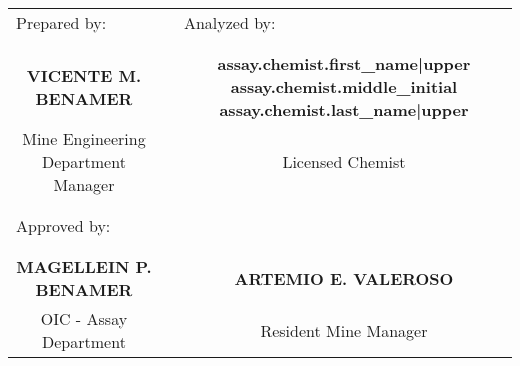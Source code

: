 \documentclass[10pt]{article}
\begin{document}
\begin{tabularx}{0.95\linewidth}{@{}cXc@{}}
    \multicolumn{1}{l}{Prepared by:}
        && \multicolumn{1}{l}{Analyzed by:} \\
    && \\ && \\
    \bfseries VICENTE M. BENAMER
        && \bfseries {{ assay.chemist.first_name|upper }} {{ assay.chemist.middle_initial }} {{ assay.chemist.last_name|upper }} \\
    Mine Engineering Department Manager
        && Licensed Chemist \\
    && \\ && \\
    \multicolumn{3}{l}{Approved by:} \\
    && \\ && \\
    \bfseries MAGELLEIN P. BENAMER
        && \bfseries ARTEMIO E. VALEROSO \\
    OIC - Assay Department
        && Resident Mine Manager \\
\end{tabularx}
\end{document}
